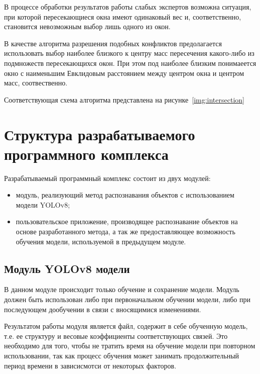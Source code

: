 
В процессе обработки результатов работы слабых экспертов возможна ситуация, при которой пересекающиеся окна имеют одинаковый вес и, соответственно, становится невозможным выбор лишь одного из окон. 

В качестве алгоритма разрешения подобных конфликтов предолагается использовать выбор наиболее близкого к центру масс пересечения какого-либо из подмножеств пересекающихся окон. При этом под наиболее близким понимаеется окно с наименьшим Евклидовым расстоянием между центром окна и центром масс, соотвественно.

Соответствующая схема алгоритма представлена на рисунке~\ref{img:intersection}



\section{Структура разрабатываемого программного комплекса}

Разрабатываемый программный комплекс состоит из двух модулей:
\begin{itemize}[label=---]
    \item модуль, реализующий метод распознавания объектов с использованием модели YOLOv8;
    \item пользовательское приложение, производящее распознавание объектов на основе разработанного метода, а так же предоставляющее возможность обучения модели, используемой в предыдущем модуле.
\end{itemize}

\subsection*{Модуль YOLOv8 модели}

В данном модуле происходит только обучение и сохранение модели. Модуль должен быть использован либо при первоначальном обучении модели, либо при последующем дообучении в связи с вносящимися изменениями.

Результатом работы модуля является файл, содержит в себе обученную модель, т.е. ее структуру и весовые коэффициенты соответствующих связей. Это необходимо для того, чтобы не тратить время на обучение модели при повторном использовании, так как процесс обучения может занимать продолжительный период времени в зависисмотси от некоторых факторов.

